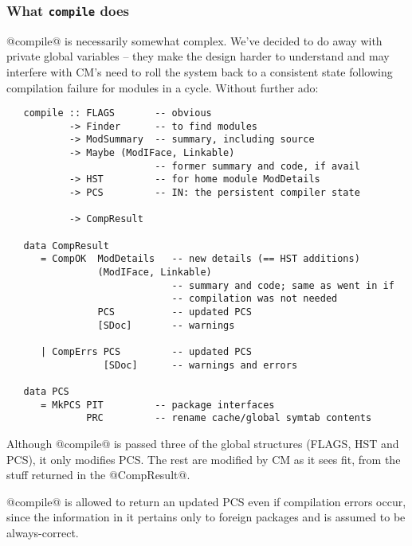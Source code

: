 \documentclass[11pt]{article}
\begin{document}
\subsubsection*{What {\tt compile} does}
@compile@ is necessarily somewhat complex.  We've decided to do away
with private global variables -- they make the design harder to
understand and may interfere with CM's need to roll the system back
to a consistent state following compilation failure for modules in 
a cycle.  Without further ado:
\begin{verbatim}
   compile :: FLAGS       -- obvious
           -> Finder      -- to find modules
           -> ModSummary  -- summary, including source
           -> Maybe (ModIFace, Linkable)
                          -- former summary and code, if avail
           -> HST         -- for home module ModDetails
           -> PCS         -- IN: the persistent compiler state

           -> CompResult

   data CompResult
      = CompOK  ModDetails   -- new details (== HST additions)
                (ModIFace, Linkable)
                             -- summary and code; same as went in if
                             -- compilation was not needed
                PCS          -- updated PCS
                [SDoc]       -- warnings

      | CompErrs PCS         -- updated PCS
                 [SDoc]      -- warnings and errors

   data PCS
      = MkPCS PIT         -- package interfaces
              PRC         -- rename cache/global symtab contents
\end{verbatim}
Although @compile@ is passed three of the global structures (FLAGS,
HST and PCS), it only modifies PCS.  The rest are modified by CM as it
sees fit, from the stuff returned in the @CompResult@.

@compile@ is allowed to return an updated PCS even if compilation
errors occur, since the information in it pertains only to foreign
packages and is assumed to be always-correct.
\end{document}
